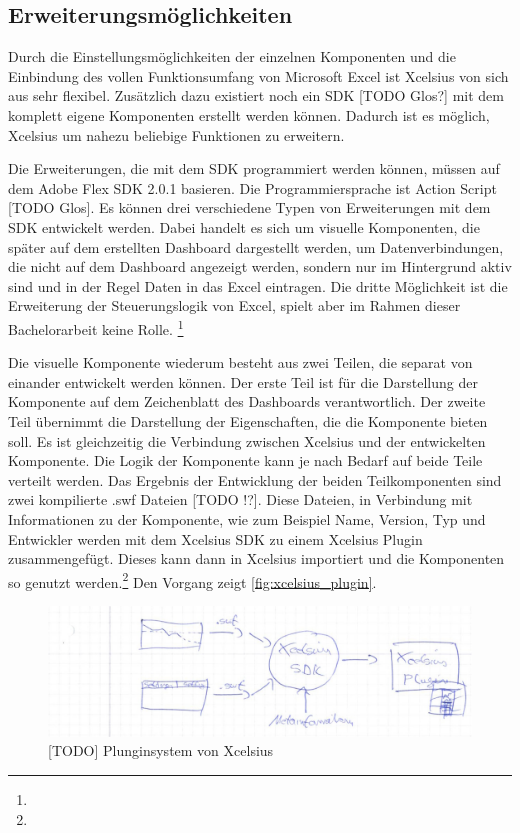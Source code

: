 
\subsection{Erweiterungsmöglichkeiten}

Durch die Einstellungsmöglichkeiten der einzelnen Komponenten und die Einbindung des vollen Funktionsumfang von Microsoft Excel ist Xcelsius von sich aus sehr flexibel. Zusätzlich dazu existiert noch ein SDK [TODO Glos?] mit dem komplett eigene Komponenten erstellt werden können. Dadurch ist es möglich, Xcelsius um nahezu beliebige Funktionen zu erweitern.

Die Erweiterungen, die mit dem SDK programmiert werden können, müssen auf dem Adobe Flex SDK 2.0.1 basieren. Die Programmiersprache ist Action Script [TODO Glos]. Es können drei verschiedene Typen von Erweiterungen mit dem SDK entwickelt werden. Dabei handelt es sich um visuelle Komponenten, die später auf dem erstellten Dashboard dargestellt werden, um Datenverbindungen, die nicht auf dem Dashboard angezeigt werden, sondern nur im Hintergrund aktiv sind und in der Regel Daten in das Excel eintragen. Die dritte Möglichkeit ist die Erweiterung der Steuerungslogik von Excel, spielt aber im Rahmen dieser Bachelorarbeit keine Rolle. \footnote{ }

Die visuelle Komponente wiederum besteht aus zwei Teilen, die separat von einander entwickelt werden können. Der erste Teil ist für die Darstellung der Komponente auf dem Zeichenblatt des Dashboards verantwortlich. Der zweite Teil übernimmt die Darstellung der Eigenschaften, die die Komponente bieten soll. Es ist gleichzeitig die Verbindung zwischen Xcelsius und der entwickelten Komponente. Die Logik der Komponente kann je nach Bedarf auf beide Teile verteilt werden. Das Ergebnis der Entwicklung der beiden Teilkomponenten sind zwei kompilierte .swf Dateien [TODO !?]. Diese Dateien, in Verbindung mit Informationen zu der Komponente, wie zum Beispiel Name, Version, Typ und Entwickler werden mit dem Xcelsius SDK zu einem Xcelsius Plugin zusammengefügt. Dieses kann dann in Xcelsius importiert und die Komponenten so genutzt werden.\footnote{ } Den Vorgang zeigt \vref{fig:xcelsius_plugin}.

\begin{figure}[h]
\centering
\setlength{\unitlength}{1mm}
\includegraphics[width=15cm]{images/Xcelsius_Plugin_Allgemein.jpg}
\caption{[TODO] Plunginsystem von Xcelsius\label{fig:xcelsius_plugin}}
\end{figure}

